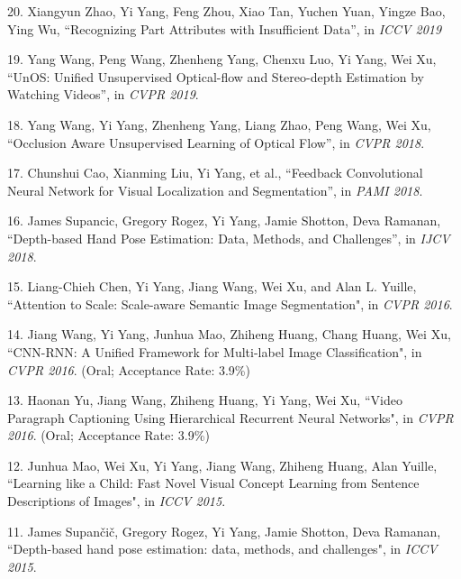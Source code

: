 \documentclass[margin]{res3}
\newenvironment{list1}{
  \begin{list}{\ding{113}}{%
      \setlength{\itemsep}{0.03in}
      \setlength{\parsep}{0in} \setlength{\parskip}{0in}
      \setlength{\topsep}{0in} \setlength{\partopsep}{0in}
      \setlength{\leftmargin}{0in}}}{\end{list}}
\begin{document}
\begin{resume}
\begin{list1}
\item[] 20. Xiangyun Zhao, Yi Yang, Feng Zhou, Xiao Tan, Yuchen Yuan, Yingze Bao, Ying Wu,
``Recognizing Part Attributes with Insufficient Data'',
  in \textit{ICCV 2019}

\item[] 19. Yang Wang, Peng Wang, Zhenheng Yang, Chenxu Luo, Yi Yang, Wei Xu,
``UnOS: Unified Unsupervised Optical-flow and Stereo-depth Estimation by Watching Videos'',
in \textit{CVPR 2019}.

\item[] 18. Yang Wang, Yi Yang, Zhenheng Yang, Liang Zhao, Peng Wang, Wei Xu,
``Occlusion Aware Unsupervised Learning of Optical Flow'',
in \textit{CVPR 2018}.

\item[] 17. Chunshui Cao, Xianming Liu, Yi Yang, et al.,
``Feedback Convolutional Neural Network for Visual Localization and Segmentation'',
in \textit{PAMI 2018}.

\item[] 16. James Supancic, Gregory Rogez, Yi Yang, Jamie Shotton, Deva Ramanan,
``Depth-based Hand Pose Estimation: Data, Methods, and Challenges'',
in \textit{IJCV 2018}.

\item[] 15. Liang-Chieh Chen, Yi Yang, Jiang Wang, Wei Xu, and Alan L. Yuille,
``Attention to Scale: Scale-aware Semantic Image Segmentation",
in \textit{CVPR 2016}.

\item[] 14. Jiang Wang, Yi Yang, Junhua Mao, Zhiheng Huang, Chang Huang, Wei Xu,
``CNN-RNN: A Unified Framework for Multi-label Image Classification",
in \textit{CVPR 2016}. (Oral; Acceptance Rate: 3.9\%)

\item[] 13. Haonan Yu, Jiang Wang, Zhiheng Huang, Yi Yang, Wei Xu,
``Video Paragraph Captioning Using Hierarchical Recurrent Neural Networks",
in \textit{CVPR 2016}. (Oral; Acceptance Rate: 3.9\%)

\item[] 12. Junhua Mao, Wei Xu, Yi Yang, Jiang Wang, Zhiheng Huang, Alan Yuille,
``Learning like a Child: Fast Novel Visual Concept Learning from Sentence Descriptions of Images",
in \textit{ICCV 2015}.

\item[] 11. James Supan\v{c}i\v{c}, Gregory Rogez, Yi Yang, Jamie Shotton, Deva Ramanan,
``Depth-based hand pose estimation: data, methods, and challenges",
in \textit{ICCV 2015}.


\end{list1}
\end{resume}
\end{document}

